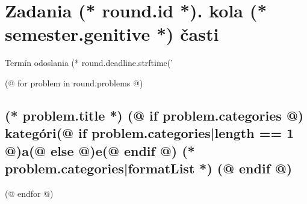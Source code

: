 \documentclass[12pt, twoside]{article}
\newcounter{volume}
\newcounter{semester}
\newcounter{round}
\newcounter{problem}
\begin{document}
    \pagestyle{main}
    \thispagestyle{first}
    \vspace*{2em}

    {
        \section{\texorpdfstring{Zadania (* round.id *). kola (* semester.genitive *) časti}{Zadania}}
        \centering
        \vspace{-1.3em}
        Termín odoslania (* round.deadline.strftime('%
    } 
        
    \pagestyle{problems}    

    (@ for problem in round.problems @)%
    \setcounter{volume}{(* volume.id *)}%
    \setcounter{semester}{(* semester.id *)}%
    \setcounter{round}{(* round.id *)}%
    \setcounter{problem}{(* problem.id *)}%
    
    \subsection{%
        \texorpdfstring{%
            \large \textbf{(* problem.title *)}%
            (@ if problem.categories @)%
            \normalsize \hfill kategóri(@ if problem.categories|length == 1 @)a(@ else @)e(@ endif @) (* problem.categories|formatList *)%
            (@ endif @)
        }{%
            (* problem.title *)%
        }%
    }%
    (@ endfor @)
\end{document}
